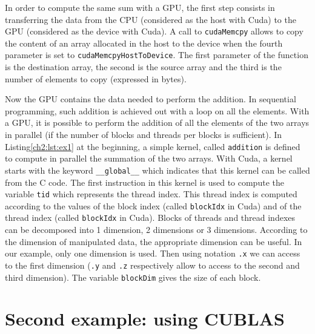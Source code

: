 In  order to  compute  the same  sum  with a  GPU, the  first  step consists  in
transferring the data from the CPU (considered as the host with Cuda) to the GPU
(considered as the  device with Cuda).  A call  to \texttt{cudaMemcpy} allows to
copy the content of an array allocated in the host to the device when the fourth
parameter                                 is                                 set
to  \texttt{cudaMemcpyHostToDevice}.  The first
parameter of the function is the  destination array, the second is the
source  array and  the third  is the  number of  elements to  copy  (expressed in
bytes).

Now the  GPU contains the  data needed to  perform the addition.   In sequential
programming, such  addition is  achieved out  with a loop  on all  the elements.
With a GPU,  it is possible to perform  the addition of all the  elements of the
two  arrays in  parallel (if  the number  of blocks  and threads  per  blocks is
sufficient).   In Listing\ref{ch2:lst:ex1}  at the  beginning, a  simple kernel,
called \texttt{addition} is defined to  compute in parallel the summation of the
two     arrays.      With     Cuda,     a     kernel     starts     with     the
keyword   \texttt{\_\_global\_\_}      which
indicates that this kernel can be called from the C code.  The first instruction
in this kernel is used to compute the variable \texttt{tid} which represents the
thread index.   This thread index is computed  according to
the           values            of           the           block           index
(called  \texttt{blockIdx}   in Cuda)  and  of the
thread   index   (called   \texttt{blockIdx}   in
Cuda). Blocks of threads and thread  indexes can be decomposed into 1 dimension,
2 dimensions or  3 dimensions.  According to the  dimension of manipulated data,
the appropriate dimension  can be useful. In our example,  only one dimension is
used.   Then using notation  \texttt{.x} we  can access  to the  first dimension
(\texttt{.y}  and \texttt{.z}  respectively allow to access  to the  second and
third dimension).   The variable \texttt{blockDim}
gives the size of each block.





\section{Second example: using CUBLAS}
\label{ch2:2ex}

